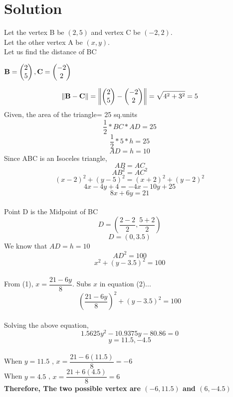 \documentclass[journal,12pt,twocolumn]{IEEEtran}
\begin{document}
\noindent
\section*{\textbf{Solution}}
\noindent
Let the vertex B be $(2,5)$ and vertex C be $(-2,2)$.\\[6pt]
Let the other vertex A be $(x,y)$.\\[6pt]
Let us find the distance of BC
\begin{center}
$\mathbf{B} = \begin{pmatrix}2\\5\end{pmatrix}, \mathbf{C} =\begin{pmatrix}-2\\2\end{pmatrix}$
\end{center}
$$\left\|\mathbf{B-C}\right\|=\left\|\mathbf{\begin{pmatrix}2\\5\end{pmatrix}-\begin{pmatrix}-2\\2\end{pmatrix}}\right\|=\sqrt{4^2+3^2}=5$$
Given, the area of the triangle= 25 sq.units\\
$$\displaystyle\frac{1}{2}*BC*AD= 25$$
$$\dfrac{1}{2}*5*h=25$$
$$AD=h=10$$
\noindent
Since ABC is an Isoceles triangle,
$$AB=AC$$
$$AB^2=AC^2$$
$$(x-2)^2+(y-5)^2=(x+2)^2+(y-2)^2$$
$$4x-4y+4=-4x-10y+25$$
\begin{equation}
    {8x+6y=21}
\end{equation} \\[6pt]
Point D is the Midpoint of BC \\[6pt]
$$D=\left(\frac{2-2}{2},\frac{5+2}{2}\right)$$
$$D=(0,3.5)$$
We know that $AD=h=10$
$$AD^2=100$$
\begin{equation}
  x^2+(y-3.5)^2=100
\end{equation}\\[6pt]
From (1), $x=\dfrac{21-6y}{8}$. Subs $x$ in equation (2)...
$$\left(\frac{21-6y}{8}\right)^2+(y-3.5)^2=100$$ \\[6pt]
Solving the above equation, \\[6pt]
$$1.5625y^2-10.9375y-80.86=0$$
$$y=11.5,-4.5$$\\[6pt]
When $y=11.5$ , $x=\dfrac{21-6(11.5)}{8}= -6$ \\[3pt]
When $y=4.5$ ,  $x=\dfrac{21+6(4.5)}{8}=6$ \\[12pt]
\textbf{Therefore, The two possible vertex are $(-6,11.5)$ and $(6,-4.5)$}
\end{document}
